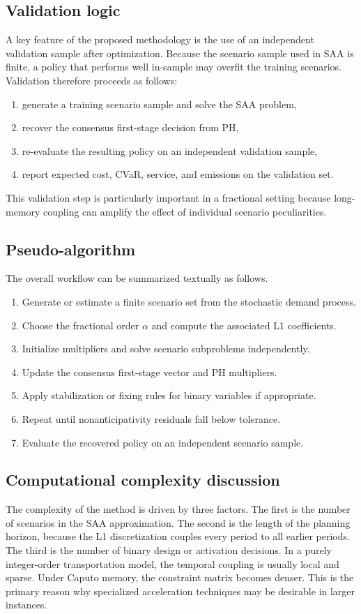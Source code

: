 \subsection{Validation logic}
A key feature of the proposed methodology is the use of an independent validation sample after optimization. Because the scenario sample used in SAA is finite, a policy that performs well in-sample may overfit the training scenarios. Validation therefore proceeds as follows:
\begin{enumerate}[label=\arabic*. ,leftmargin=1.6em]
    \item generate a training scenario sample and solve the SAA problem,
    \item recover the consensus first-stage decision from PH,
    \item re-evaluate the resulting policy on an independent validation sample,
    \item report expected cost, CVaR, service, and emissions on the validation set.
\end{enumerate}
This validation step is particularly important in a fractional setting because long-memory coupling can amplify the effect of individual scenario peculiarities.

\subsection{Pseudo-algorithm}
The overall workflow can be summarized textually as follows.
\begin{enumerate}[label=\textbf{Step \arabic*:},leftmargin=2.2em]
    \item Generate or estimate a finite scenario set from the stochastic demand process.
    \item Choose the fractional order $\alpha$ and compute the associated L1 coefficients.
    \item Initialize multipliers and solve scenario subproblems independently.
    \item Update the consensus first-stage vector and PH multipliers.
    \item Apply stabilization or fixing rules for binary variables if appropriate.
    \item Repeat until nonanticipativity residuals fall below tolerance.
    \item Evaluate the recovered policy on an independent scenario sample.
\end{enumerate}

\subsection{Computational complexity discussion}
The complexity of the method is driven by three factors. The first is the number of scenarios in the SAA approximation. The second is the length of the planning horizon, because the L1 discretization couples every period to all earlier periods. The third is the number of binary design or activation decisions. In a purely integer-order transportation model, the temporal coupling is usually local and sparse. Under Caputo memory, the constraint matrix becomes denser. This is the primary reason why specialized acceleration techniques may be desirable in larger instances.

